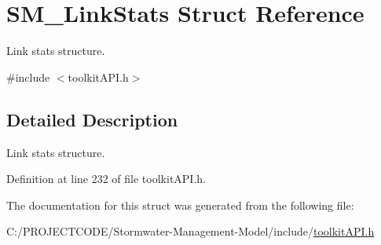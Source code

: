 \hypertarget{struct_s_m___link_stats}{}\section{S\+M\+\_\+\+Link\+Stats Struct Reference}
\label{struct_s_m___link_stats}


Link stats structure.  




{\ttfamily \#include $<$toolkit\+A\+P\+I.\+h$>$}



\subsection{Detailed Description}
Link stats structure. 

Definition at line 232 of file toolkit\+A\+P\+I.\+h.



The documentation for this struct was generated from the following file\+:\begin{DoxyCompactItemize}
\item 
C\+:/\+P\+R\+O\+J\+E\+C\+T\+C\+O\+D\+E/\+Stormwater-\/\+Management-\/\+Model/include/\hyperlink{toolkit_a_p_i_8h}{toolkit\+A\+P\+I.\+h}\end{DoxyCompactItemize}
